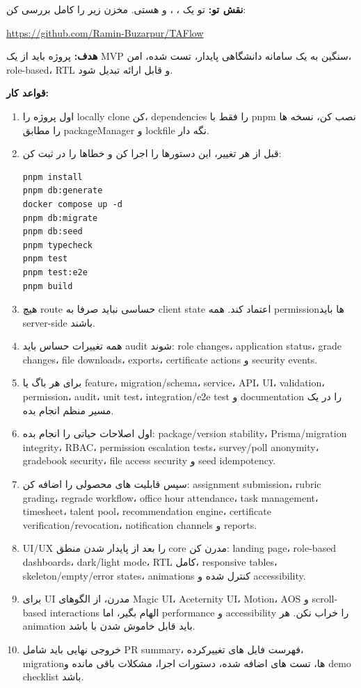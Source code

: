\documentclass[11pt,a4paper]{article}
\begin{document}
\begin{framed}
\textbf{نقش تو:} تو یک ، ،  و  هستی. مخزن زیر را کامل بررسی کن:
\begin{latin}
\url{https://github.com/Ramin-Buzarpur/TAFlow}
\end{latin}

\textbf{هدف:} پروژه  باید از یک MVP سنگین به یک سامانه دانشگاهی پایدار، تست شده، امن، role-based، RTL و قابل ارائه تبدیل شود.

\textbf{قواعد کار:}
\begin{enumerate}
\item اول پروژه را locally clone کن، dependencies را فقط با pnpm نصب کن، نسخه ها را مطابق packageManager و lockfile نگه دار.
\item قبل از هر تغییر، این دستورها را اجرا کن و خطاها را در  ثبت کن:
\begin{latin}
\begin{verbatim}
pnpm install
pnpm db:generate
docker compose up -d
pnpm db:migrate
pnpm db:seed
pnpm typecheck
pnpm test
pnpm test:e2e
pnpm build
\end{verbatim}
\end{latin}
\item هیچ route حساسی نباید صرفا به client state اعتماد کند. همه permissionها باید server-side باشند.
\item همه تغییرات حساس باید audit شوند: role changes، application status، grade changes، file downloads، exports، certificate actions و security events.
\item برای هر باگ یا feature، migration/schema، service، API، UI، validation، permission، audit، unit test، integration/e2e test و documentation را در یک مسیر منظم انجام بده.
\item اول اصلاحات حیاتی را انجام بده: package/version stability، Prisma/migration integrity، RBAC، permission escalation tests، survey/poll anonymity، gradebook security، file access security و seed idempotency.
\item سپس قابلیت های محصولی را اضافه کن: assignment submission، rubric grading، regrade workflow، office hour attendance، task management، timesheet، talent pool، recommendation engine، certificate verification/revocation، notification channels و reports.
\item UI/UX را بعد از پایدار شدن منطق core مدرن کن: landing page، role-based dashboards، dark/light mode، RTL کامل، responsive tables، skeleton/empty/error states، animations کنترل شده و accessibility.
\item برای UI مدرن، از الگوهای Magic UI، Aceternity UI، Motion، AOS و scroll-based interactions الهام بگیر، اما performance و accessibility را خراب نکن. هر animation باید قابل خاموش شدن با  باشد.
\item خروجی نهایی باید شامل PR summary، فهرست فایل های تغییرکرده، migrationها، تست های اضافه شده، دستورات اجرا، مشکلات باقی مانده و demo checklist باشد.
\end{enumerate}


\end{framed}
\end{document}
